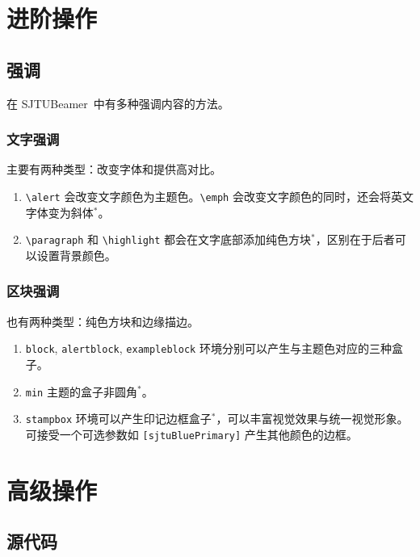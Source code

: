 \documentclass[
    UTF8,
    heading=true,
    12pt,
    a4paper
]{ctexrep}
\def\themename{\textsf{SJTUBeamer}}
\begin{document}
    \part{进阶操作}

    \chapter{强调}
    
    在 \themename\ 中有多种强调内容的方法。

    \section{文字强调}

    主要有两种类型：改变字体和提供高对比。
    

    \begin{enumerate}\small
        \item \texttt{\textbackslash{}alert} 会改变文字颜色为主题色。\texttt{\textbackslash{}emph} 会改变文字颜色的同时，还会将英文字体变为斜体$^*$。
        \item \texttt{\textbackslash{}paragraph} 和 \texttt{\textbackslash{}highlight} 都会在文字底部添加纯色方块$^*$，区别在于后者可以设置背景颜色。
    \end{enumerate}

    \section{区块强调}

    也有两种类型：纯色方块和边缘描边。



    \begin{enumerate}\small
        \item \texttt{block}, \texttt{alertblock}, \texttt{exampleblock} 环境分别可以产生与主题色对应的三种盒子。
        \item \texttt{min} 主题的盒子非圆角$^*$。
        \item \texttt{stampbox} 环境可以产生印记边框盒子$^*$，可以丰富视觉效果与统一视觉形象。可接受一个可选参数如 \texttt{[sjtuBluePrimary]} 产生其他颜色的边框。
    \end{enumerate}

    \part{高级操作}
    \chapter{源代码}
\end{document}

